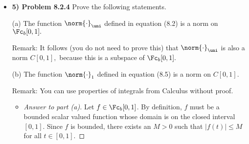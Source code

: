 \documentclass[10pt,twoside]{article}
\begin{document}
\begin{itemize}
\begin{proof}[Answer.]
    \rule{12cm}{0.5pt}
    
    Now, assume that 
    \[\lim_{a\to 0}\biggparen{\sup_{x\in\R}\Bigabs{f(x) - f(x-a)}} = 0\]
    Then, for all $\epsilon >0$, 
    \[\lim_{a\to 0}\biggparen{\sup_{x\in\R}\Bigabs{f(x) - f(x-a)}} \leq \epsilon\]
    So for any $a\geq 0$ there is some $\epsilon >0$ such that
    \[\sup_{x\in\R}\Bigabs{f(x) - f(x-a)} \leq \epsilon\]
    that is,
    \[|f(x) - f(x-a)|\leq \epsilon\]
    for all $x\in\R$.
    
    For any two points $x,y\in\R$, either $x<y$ or $y\leq x$.
    
    Without loss of generality, let $y\leq x$. Then for some $a\geq 0$, we have that $y = x - a$. Choose $\delta >a$. Then,
    \[|x - y| = |x - (x - a)| = a < \delta\]
    By assumption, $|f(x) - f(x-a)| = |f(x) - f(y)|\leq \epsilon$ for all $x\in \R$. That is, for every $\epsilon >0$ there exists $\delta >0$, such that if
    \[|x - y|<\delta\]
    then 
    \[|f(x) - f(y)|\leq \epsilon\]
    Therefore, $f$ is uniformly continuous.\medskip
    
    Thus, we have show that $f:\R\to\R$ is uniformly continuous if and only if 
    \[\lim_{a \to 0} \, \biggparen{\sup_{x \in \R} \, |f(x) - f(x-a)|} \Eq 0.\]
    \end{proof}
    
    \newpage
    
    \item\textbf{5) Problem 8.2.4} \newline
    \noindent\makebox[\linewidth]{\rule{18cm}{0.4pt}}
    Prove the following statements.

\smallskip
(a) The function $\norm{\cdot}_\uni$ defined
in equation (8.2) %
is a norm on $\Fc_b[0,1].$

Remark: It follows (you do not need to prove this) that
$\norm{\cdot}_\uni$ is also a norm $C[0,1],$
because this is a subspace of $\Fc_b[0,1].$

\medskip
(b) The function $\norm{\cdot}_1$ defined in
equation (8.5) %
is a norm on $C[0,1].$

Remark: You can use properties of integrals from Calculus without proof.
    \begin{itemize}
        \item\begin{proof}[Answer to part (a)]
        Let $f\in\Fc_b[0,1]$. By definition, $f$ must be a bounded scalar valued function whose domain is on the closed interval $[0,1]$. Since $f$ is bounded, there exists an $M>0$ such that $|f(t)|\leq M$ for all $t\in[0,1]$. 
        

\end{proof}
\end{itemize}
\end{itemize}
\end{document}
